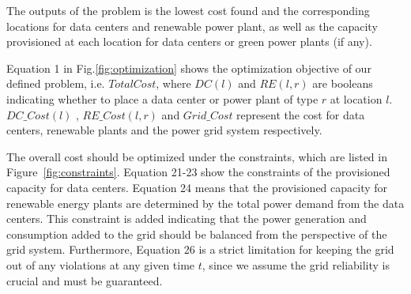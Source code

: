 
The outputs of the problem is the lowest cost found and the corresponding locations for data centers and renewable power plant, as well as the capacity provisioned at each location for data centers or green power plants (if any).

Equation 1 in Fig.\ref{fig:optimization} shows the optimization objective of our defined problem, i.e. $TotalCost$, where $DC(l)$ and $RE(l,r)$ are booleans indicating whether to place a data center or power plant of type $r$ at location $l$. $DC\_Cost(l)$ , $RE\_Cost(l,r)$ and $Grid\_Cost$ represent the cost for data centers, renewable plants and the power grid system respectively.


The overall cost should be optimized under the constraints, which are listed in Figure~\ref{fig:constraints}. Equation 21-23 show the constraints of the provisioned capacity for data centers. Equation 24 means that the provisioned capacity for renewable energy plants are determined by the total power demand from the data centers. This constraint is added indicating that the power generation and consumption added to the grid should be balanced from the perspective of the grid system. Furthermore, Equation 26
is a strict limitation for keeping the grid out of any violations at any given time $t$, since we assume the grid reliability is crucial and must be guaranteed.

